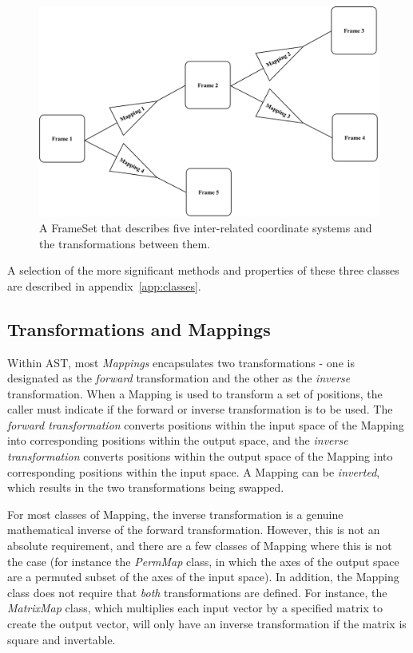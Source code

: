 \documentclass[final,authoryear,5p,times,twocolumn]{elsarticle}
\begin{document}
\begin{figure}[h]
\centering
\includegraphics[width=\columnwidth]{complex-frameset}
\caption{A FrameSet that describes five inter-related coordinate systems
and the transformations between them. }
\label{fig:complex-frameset}
\end{figure}

A selection of the more significant methods and properties of these
three classes are described in appendix~\ref{app:classes}.

\subsection{Transformations and Mappings}
Within AST, most \emph{Mappings} encapsulates two transformations - one is
designated as the \emph{forward} transformation and the other as the
\emph{inverse} transformation. When a Mapping is used to transform a set
of positions, the caller must indicate if the forward or inverse
transformation is to be used. The \emph{forward transformation} converts
positions within the input space of the Mapping into corresponding
positions within the output space, and the \emph{inverse transformation}
converts positions within the output space of the Mapping into corresponding
positions within the input space. A Mapping can be \emph{inverted}, which
results in the two transformations being swapped.

For most classes of Mapping, the inverse transformation is a genuine
mathematical inverse of the forward transformation. However, this is not
an absolute requirement, and there are a few classes of Mapping where
this is not the case (for instance the \emph{PermMap} class, in which the
axes of the output space are a permuted subset of the axes of the input
space). In addition, the Mapping class does not require that \emph{both}
transformations are defined. For instance, the \emph{MatrixMap} class, which
multiplies each input vector by a specified matrix to create the output
vector, will only have an inverse transformation if the matrix is square
and invertable.
\end{document}
